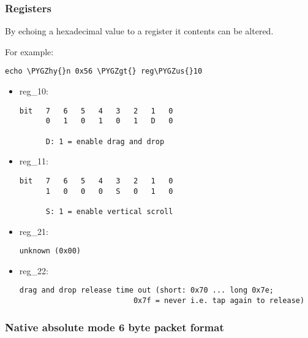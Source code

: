 \documentclass[a4paper,8pt,english]{sphinxmanual}
\def\PYGZus{\char`\_}
\def\PYGZgt{\char`\>}
\def\PYGZhy{\char`\-}
\begin{document}
\subsubsection{Registers}
\label{input/devices/elantech:id1}
By echoing a hexadecimal value to a register it contents can be altered.

For example:

\begin{Verbatim}[commandchars=\\\{\}]
echo \PYGZhy{}n 0x56 \PYGZgt{} reg\PYGZus{}10
\end{Verbatim}
\begin{itemize}
\item {} 
reg\_10:

\begin{Verbatim}[commandchars=\\\{\}]
bit   7   6   5   4   3   2   1   0
      0   1   0   1   0   1   D   0

      D: 1 = enable drag and drop
\end{Verbatim}

\item {} 
reg\_11:

\begin{Verbatim}[commandchars=\\\{\}]
bit   7   6   5   4   3   2   1   0
      1   0   0   0   S   0   1   0

      S: 1 = enable vertical scroll
\end{Verbatim}

\item {} 
reg\_21:

\begin{Verbatim}[commandchars=\\\{\}]
unknown (0x00)
\end{Verbatim}

\item {} 
reg\_22:

\begin{Verbatim}[commandchars=\\\{\}]
drag and drop release time out (short: 0x70 ... long 0x7e;
                          0x7f = never i.e. tap again to release)
\end{Verbatim}

\end{itemize}


\subsubsection{Native absolute mode 6 byte packet format}
\label{input/devices/elantech:native-absolute-mode-6-byte-packet-format}
\end{document}
